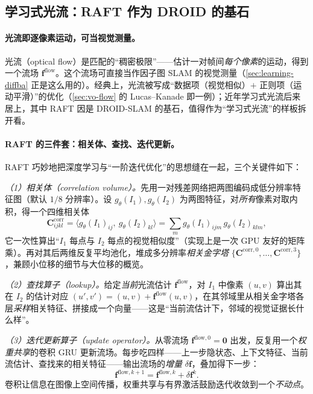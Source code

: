 \subsection{学习式光流：RAFT 作为 DROID 的基石}
\label{sec:learning-flow}

\paragraph{光流即逐像素运动，可当视觉测量。}
光流（optical flow）是匹配的“稠密极限”——估计一对帧间\emph{每个像素}的运动，得到一个流场 $\mathbf{f}^{\mathrm{flow}}$。这个流场可直接当作因子图 SLAM 的视觉测量（\cref{sec:learning-diffba} 正是这么用的）。经典上，光流被写成“数据项（视觉相似）$+$ 正则项（运动平滑）”的优化（\cref{sec:vo-flow} 的 Lucas--Kanade 即一例）；近年学习式光流后来居上，其中 RAFT\cite{teed2020raft} 因是 DROID-SLAM 的基石，值得作为“学习式光流”的样板拆开看。

\paragraph{RAFT 的三件套：相关体、查找、迭代更新。}
RAFT 巧妙地把深度学习与“一阶迭代优化”的思想缝在一起，三个关键件如下\cite{teed2020raft}：

\emph{（1）相关体（correlation volume）。}\;先用一对残差网络把两图编码成低分辨率特征图（默认 $1/8$ 分辨率）。设 $g_\theta(I_1),g_\theta(I_2)$ 为两图特征，对\emph{所有}像素对取内积，得一个四维相关体
\begin{equation}
  \mathbf{C}^{\mathrm{corr}}_{ijkl}
  =\big\langle g_\theta(I_1)_{ij},\ g_\theta(I_2)_{kl}\big\rangle
  =\sum_m g_\theta(I_1)_{ijm}\,g_\theta(I_2)_{klm},
  \label{eq:learn-raft-corr}
\end{equation}
它一次性算出“$I_1$ 每点与 $I_2$ 每点的视觉相似度”（实现上是一次 GPU 友好的矩阵乘）。再对其后两维反复平均池化，堆成多分辨率\emph{相关金字塔} $\{\mathbf{C}^{\mathrm{corr},0},\dots,\mathbf{C}^{\mathrm{corr},3}\}$，兼顾小位移的细节与大位移的概览。

\emph{（2）查找算子（lookup）。}\;给定\emph{当前}光流估计 $\mathbf{f}^{\mathrm{flow}}$，对 $I_1$ 中像素 $(u,v)$ 算出其在 $I_2$ 的估计对应 $(u',v')=(u,v)+\mathbf{f}^{\mathrm{flow}}(u,v)$，在其邻域里从相关金字塔各层\emph{采样}相关特征、拼接成一个向量——这是“当前流估计下，邻域的视觉证据长什么样”。

\emph{（3）迭代更新算子（update operator）。}\;从零流场 $\mathbf{f}^{\mathrm{flow},0}=\mathbf{0}$ 出发，反复用一个\emph{权重共享}的卷积 GRU 更新流场。每步吃四样——上一步隐状态、上下文特征、当前流估计、查找来的相关特征——输出流场的\emph{增量} $\delta\mathbf{f}$，叠加得下一步：
\begin{equation}
  \mathbf{f}^{\mathrm{flow},k+1}=\mathbf{f}^{\mathrm{flow},k}+\delta\mathbf{f}^{k}.
  \label{eq:learn-raft-iter}
\end{equation}
卷积让信息在图像上空间传播，权重共享与有界激活鼓励迭代收敛到一个\emph{不动点}。

